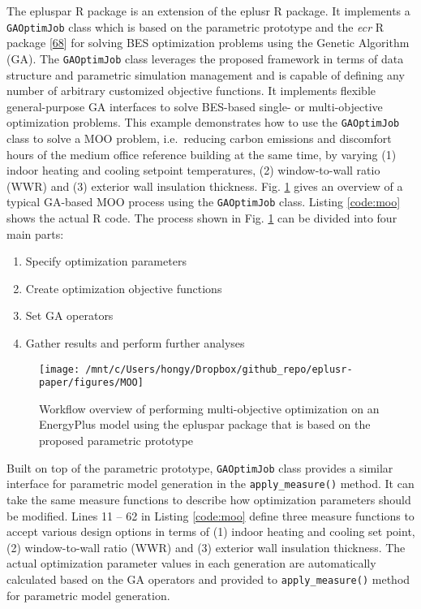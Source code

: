 \documentclass[3p, times]{elsarticle} %
\providecommand{\tightlist}{%
  \setlength{\itemsep}{0pt}\setlength{\parskip}{0pt}}
\begin{document}
The epluspar R package is an extension of the eplusr R package. It implements a
\texttt{GAOptimJob} class which is based on the parametric prototype and the \emph{ecr} R
package {[}\protect\hyperlink{ref-Bossek2017}{68}{]} for solving BES optimization problems using the Genetic
Algorithm (GA). The \texttt{GAOptimJob} class leverages the proposed framework in terms
of data structure and parametric simulation management and is capable of
defining any number of arbitrary customized objective functions. It implements
flexible general-purpose GA interfaces to solve BES-based single- or
multi-objective optimization problems. This example demonstrates how to use the
\texttt{GAOptimJob} class to solve a MOO problem, i.e.~reducing carbon emissions and
discomfort hours of the medium office reference building at the same time, by
varying (1) indoor heating and cooling setpoint temperatures, (2) window-to-wall
ratio (WWR) and (3) exterior wall insulation thickness. Fig. \ref{fig:flow-ga}
gives an overview of a typical GA-based MOO process using the \texttt{GAOptimJob}
class. Listing \ref{code:moo} shows the actual R code. The process shown in
Fig. \ref{fig:flow-ga} can be divided into four main parts:

\begin{enumerate}
\def\labelenumi{\arabic{enumi}.}
\tightlist
\item
  Specify optimization parameters
\item
  Create optimization objective functions
\item
  Set GA operators
\item
  Gather results and perform further analyses
\end{enumerate}

\begin{figure}[!htb]
\texttt{[image: /mnt/c/Users/hongy/Dropbox/github\_repo/eplusr-paper/figures/MOO]} \caption{Workflow overview of performing multi-objective optimization on an EnergyPlus model using the epluspar package that is based on the proposed parametric prototype}\label{fig:flow-ga}
\end{figure}

Built on top of the parametric prototype, \texttt{GAOptimJob} class provides a similar
interface for parametric model generation in the \texttt{apply\_measure()} method. It
can take the same measure functions to describe how optimization parameters
should be modified. Lines 11 -- 62 in Listing \ref{code:moo} define three
measure functions to accept various design options in terms of (1) indoor
heating and cooling set point, (2) window-to-wall ratio (WWR) and (3) exterior
wall insulation thickness. The actual optimization parameter values in each
generation are automatically calculated based on the GA operators and provided
to \texttt{apply\_measure()} method for parametric model generation.
\end{document}
